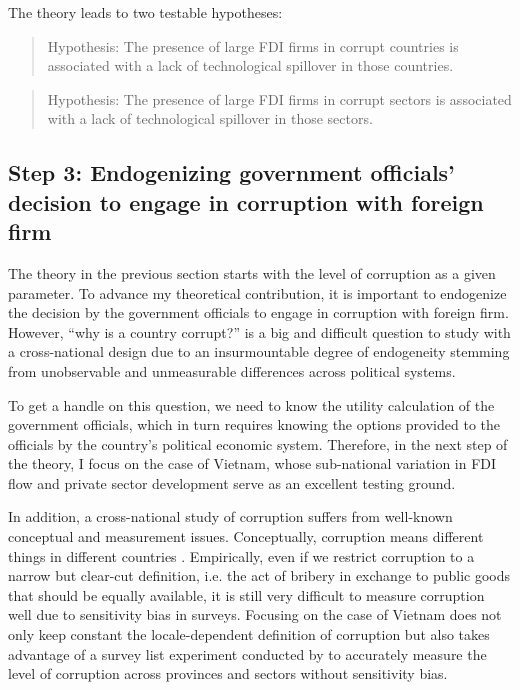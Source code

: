 The theory leads to two testable hypotheses:

\begin{quote}
Hypothesis: The presence of large FDI firms in corrupt countries is associated with a lack of technological spillover in those countries.
\end{quote}

\begin{quote}
Hypothesis: The presence of large FDI firms in corrupt sectors is associated with a lack of technological spillover in those sectors.
\end{quote}

\subsection{Step 3: Endogenizing government officials' decision to engage in corruption with foreign firm}

The theory in the previous section starts with the level of corruption as a given parameter. To advance my theoretical contribution, it is important to endogenize the decision by the government officials to engage in corruption with foreign firm. However, ``why is a country corrupt?'' is a big and difficult question to study with a cross-national design due to an insurmountable degree of endogeneity stemming from unobservable and unmeasurable differences across political systems. 

To get a handle on this question, we need to know the utility calculation of the government officials, which in turn requires knowing the options provided to the officials by the country's political economic system. Therefore, in the next step of the theory, I focus on the case of Vietnam, whose sub-national variation in FDI flow and private sector development serve as an excellent testing ground.

In addition, a cross-national study of corruption suffers from well-known conceptual and measurement issues. Conceptually, corruption means different things in different countries \citep{Rosen2010}. Empirically, even if we restrict corruption to a narrow but clear-cut definition, i.e. the act of bribery in exchange to public goods that should be equally available, it is still very difficult to measure corruption well due to sensitivity bias in surveys. Focusing on the case of Vietnam does not only keep constant the locale-dependent definition of corruption but also takes advantage of a survey list experiment conducted by \citet{Malesky2015} to accurately measure the level of corruption across provinces and sectors without sensitivity bias.

